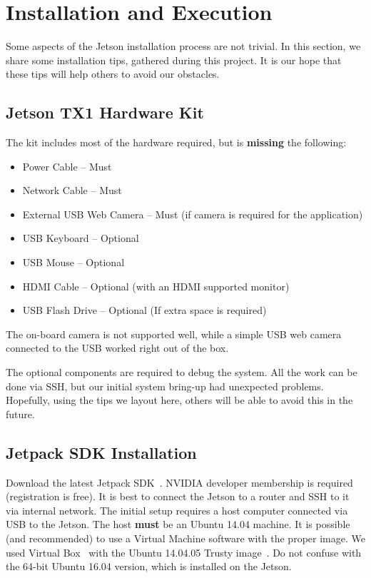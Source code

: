 \section{Installation and Execution}
\label{sec:installation}
Some aspects of the Jetson installation process are not trivial. In this section, we share some installation tips, gathered during this project. It is our hope that these tips will help others to avoid our obstacles.

\subsection{Jetson TX1 Hardware Kit}
The kit includes most of the hardware required, but is \textbf{missing} the following:
\begin{itemize}
\setlength\itemsep{0.1em}
\item Power Cable -- Must
\item Network Cable -- Must
\item External USB Web Camera -- Must (if camera is required for the application)
\item USB Keyboard -- Optional
\item USB Mouse -- Optional
\item HDMI Cable -- Optional (with an HDMI supported monitor)
\item USB Flash Drive -- Optional (If extra space is required)
\end{itemize}

The on-board camera is not supported well, while a simple USB web camera connected to the USB worked right out of the box.

The optional components are required to debug the system. All the work can be done via SSH, but our initial system bring-up had unexpected problems. Hopefully, using the tips we layout here, others will be able to avoid this in the future.

\subsection{Jetpack SDK Installation}
Download the latest Jetpack SDK~\cite{jetpackinstall}. NVIDIA developer membership is required (registration is free).
It is best to connect the Jetson to a router and SSH to it via internal network. The initial setup requires a host computer connected via USB to the Jetson. The host \textbf{must} be an Ubuntu 14.04 machine. It is possible (and recommended) to use a Virtual Machine software with the proper image. We used Virtual Box~\cite{virtualboxinstall} with the Ubuntu 14.04.05 Trusty image~\cite{virtualboxubuntuimage}. Do not confuse with the 64-bit Ubuntu 16.04 version, which is installed on the Jetson.

